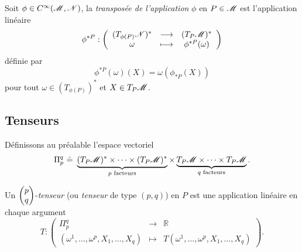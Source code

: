 \documentclass[a4paper,11pt]{report}
\begin{document}
                \begin{defn}
                    Soit $\phi\in C^\infty(\mathscr{M},\mathscr{N})$, la \textit{transposée de l'application} $\phi$ en $P\in\mathscr{M}$ est l'application linéaire
                    \begin{equation}
                        \phi^{*P}:\left(
                    \begin{array}{ccc}
                        (T_{\phi(P)}\mathscr{N})^* & \longrightarrow & (T_P\mathscr{M})^* \\
                        \omega & \longmapsto & \phi^{*P}(\omega)
                    \end{array}
                    \right)
                    \end{equation}
                    définie par
                    \begin{equation}
                        \phi^{*P}(\omega)(X) = \omega(\phi_{*P}(X))
                    \end{equation}
                    pour tout $\omega\in (T_{\phi(P)})^*$ et $X\in T_P\mathscr{M}$.
                \end{defn}
            
            \subsection{Tenseurs}
                
                Définissons au préalable l'espace vectoriel
                \begin{equation}
                    \Pi^q_p ~\hat{=}~ \underbrace{(T_P\mathscr{M})^*\times\dots\times (T_P\mathscr{M})^*}_{\text{$p$ facteurs}}\times\underbrace{T_P\mathscr{M}\times\dots\times T_P\mathscr{M}}_{\text{$q$ facteurs}}.
                \end{equation}
                
                \begin{defn}
                    Un $\begin{pmatrix}p\\q\end{pmatrix}$-\textit{tenseur} (ou \textit{tenseur} de type $(p,q)$) en $P$ est une application linéaire en chaque argument
                    \begin{equation}
                        T:\left(
                    \begin{array}{ccc}
                        \Pi^q_p & \longrightarrow & \mathbb{R} \\
                        (\omega^1,\dots,\omega^p,X_1,\dots,X_q) & \longmapsto & T(\omega^1,\dots,\omega^p,X_1,\dots,X_q)
                    \end{array}
                    \right).
                    \end{equation}
                \end{defn}
                
\end{document}
